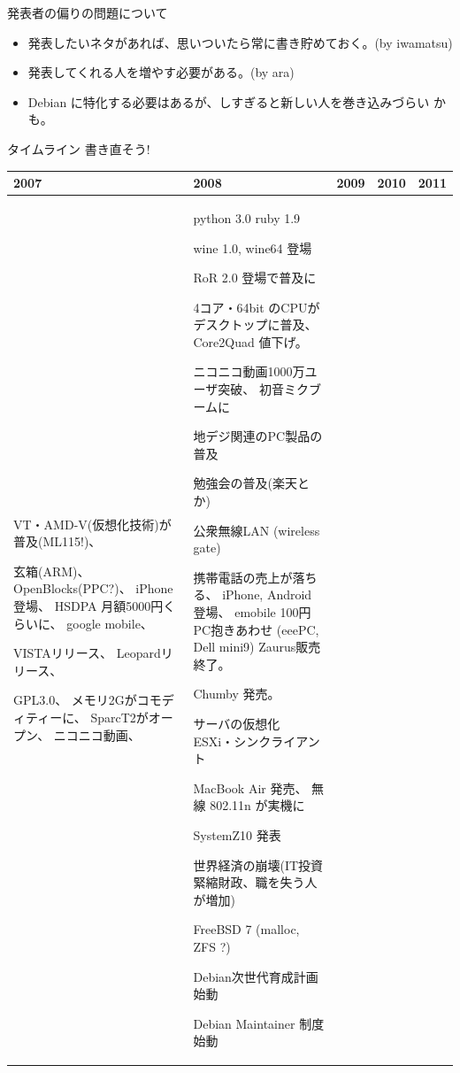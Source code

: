 \begin{frame}{発表者の偏りの問題について}
\begin{itemize}
\item 発表したいネタがあれば、思いついたら常に書き貯めておく。(by
      iwamatsu)
\item 発表してくれる人を増やす必要がある。(by ara)
\item Debian に特化する必要はあるが、しすぎると新しい人を巻き込みづらい
      かも。
\end{itemize}
\end{frame}

\begin{frame}{タイムライン 書き直そう!}

{\scriptsize
\begin{tabular}[t]{|p{4em}|p{4em}|p{9em}|p{7em}|p{6em}|}
\hline
2007 &2008 &2009 & 2010 & 2011 \\
\hline
VT・AMD-V(仮想化技術)が普及(ML115!)、

玄箱(ARM)、
OpenBlocks(PPC?)、
iPhone登場、 
HSDPA 月額5000円くらいに、
google mobile、

VISTAリリース、 
Leopardリリース、 

GPL3.0、
メモリ2Gがコモディティーに、
SparcT2がオープン、 
ニコニコ動画、
& 
python 3.0
ruby 1.9

wine 1.0, wine64 登場

RoR 2.0 登場で普及に

4コア・64bit のCPUがデスクトップに普及、
Core2Quad 値下げ。

ニコニコ動画1000万ユーザ突破、
初音ミクブームに

地デジ関連のPC製品の普及

勉強会の普及(楽天とか)

公衆無線LAN (wireless gate)

携帯電話の売上が落ちる、
iPhone, Android 登場、
emobile 100円PC抱きあわせ
(eeePC, Dell mini9)
Zaurus販売終了。

Chumby 発売。

サーバの仮想化 ESXi・シンクライアント

MacBook Air 発売、
無線 802.11n が実機に

SystemZ10 発表

世界経済の崩壊(IT投資緊縮財政、職を失う人が増加)

FreeBSD 7 (malloc, ZFS ?)

Debian次世代育成計画始動

Debian Maintainer 制度始動


\end{tabular}}
\end{frame}
